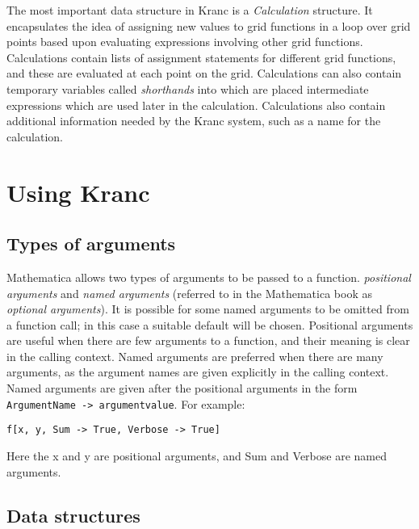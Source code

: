 \documentclass{report}
\begin{document}
The most important data structure in Kranc is a {\em Calculation}
structure. It encapsulates the idea of assigning new values to grid
functions in a loop over grid points based upon evaluating expressions
involving other grid functions. Calculations contain lists of
assignment statements for different grid functions, and these are
evaluated at each point on the grid.  Calculations can also contain
temporary variables called {\em shorthands} into which are placed
intermediate expressions which are used later in the
calculation. Calculations also contain additional information needed
by the Kranc system, such as a name for the calculation.

\chapter{Using Kranc}

\section{Types of arguments}

Mathematica allows two types of arguments to be passed to a function.
{\em positional arguments} and {\em named arguments} (referred to in
the Mathematica book as {\em optional arguments}).  It is possible for
some named arguments to be omitted from a function call; in this case
a suitable default will be chosen.  Positional arguments are useful
when there are few arguments to a function, and their meaning is clear
in the calling context.  Named arguments are preferred when there are
many arguments, as the argument names are given explicitly in the
calling context. Named arguments are given after the positional
arguments in the form \verb|ArgumentName -> argumentvalue|.  For
example:

\begin{center}
\begin{minipage}{0.8 \textwidth}
\begin{verbatim}
f[x, y, Sum -> True, Verbose -> True]
\end{verbatim}
\end{minipage}
\end{center}
Here the x and y are positional arguments, and Sum and Verbose are
named arguments.

\section{Data structures}
\end{document}
